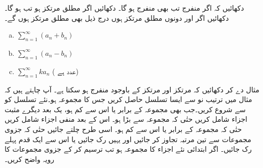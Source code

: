 دکھائیں کہ اگر  منفرج تب  بھی منفرج ہو گا۔
دکھائیں اگر  مطلق مرتکز ہو تب  ہو گا۔
دکھائیں اگر  اور  دونوں مطلق مرتکز ہوں درج ذیل بھی مطلق مرتکز ہوں گے۔
\begin{multicols}{3}
\begin{enumerate}[a.]
\item
$\sum_{n=1}^{\infty}(a_n+b_n)$
\item
$\sum_{n=1}^{\infty}(a_n-b_n)$
\item
$\sum_{n=1}^{\infty}ka_n$\quad
( عدد ہے)
\end{enumerate}
\end{multicols}
مثال دے کر دکھائیں کہ مرتکز  اور مرتکز  کے باوجود 
 منفرج ہو سکتا ہے۔
آپ چاہتے ہیں کہ مثال  میں ترتیب نو سے ایسا تسلسل حاصل کریں جس کا مجموعہ  ہو۔نئے تسلسل کو  سے شروع کریں۔جب بھی مجموعہ  کے برابر یا اس سے کم ہو، یک بعد دیگرے مثبت اجزاء  شامل کریں حتٰی کہ مجموعہ  سے بڑا ہو۔ اس کے بعد منفی اجزاء شامل کریں حتٰی کہ مجموعہ  کے برابر یا اس سے کم ہو۔ اسی طرح چلتے جائیں حتٰی کہ جزوی مجموعات  سے تین مرتبہ تجاوز کر جائیں اور یہیں رک جائیں یا اس سے ایک قدم پہلے رک جائیں۔ اگر ابتدائی  نئے اجزاء کا مجموعہ  ہو تب  ترسیم کر کے جزوی مجموعات کا رویہ واضح کریں۔
\\
